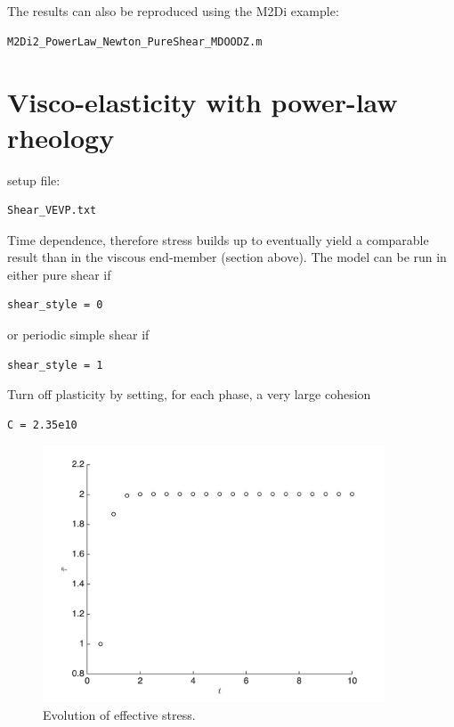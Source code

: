 \documentclass[12pt,english,openany]{scrbook}
\begin{document}
The results can also be reproduced using the M2Di example:
\begin{verbatim} 
M2Di2_PowerLaw_Newton_PureShear_MDOODZ.m
\end{verbatim}

\section{Visco-elasticity with power-law rheology}


setup file:
\begin{verbatim} 
Shear_VEVP.txt
\end{verbatim}

Time dependence, therefore stress builds up to eventually yield a comparable result than in the viscous end-member (section above).
The model can be run in either pure shear if 
\begin{verbatim} 
shear_style = 0
\end{verbatim}

or periodic simple shear if 
\begin{verbatim} 
shear_style = 1
\end{verbatim}

Turn off plasticity by setting, for each phase, a very large cohesion
\begin{verbatim} 
C = 2.35e10
\end{verbatim}

\begin{figure}[ht!]
\centerline{\includegraphics[height=3.0in]{./Figures/PureShear_pwl_VE_evol}}
\caption{Evolution of effective stress.}
\label{PureShear_pwl_VE_evol}
\end{figure}
\end{document}
